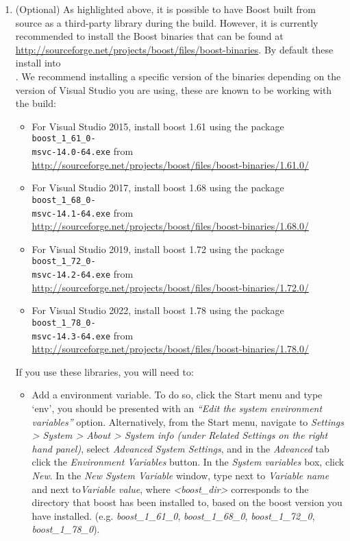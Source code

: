 \begin{enumerate}
  \item (Optional) As highlighted above, it is possible to have Boost built
  from source as a third-party library during the \nekpp build. However, it
  is currently recommended to install the Boost binaries that can be found at
  \url{http://sourceforge.net/projects/boost/files/boost-binaries}. By
  default these install into \\ . We recommend installing a specific version of the
    binaries depending on the version of Visual Studio you are using,
    these are known to be working with the \nekpp build:
  \begin{itemize}
  	\item For Visual Studio 2015, install boost 1.61 using the package
	 \texttt{boost\_1\_61\_0-\\msvc-14.0-64.exe} from \url{http://sourceforge.net/projects/boost/files/boost-binaries/1.61.0/}
  	\item For Visual Studio 2017, install boost 1.68 using the package
	 \texttt{boost\_1\_68\_0-\\msvc-14.1-64.exe} from \url{http://sourceforge.net/projects/boost/files/boost-binaries/1.68.0/}
  	\item For Visual Studio 2019, install boost 1.72 using the package
	 \texttt{boost\_1\_72\_0-\\msvc-14.2-64.exe}  from \url{http://sourceforge.net/projects/boost/files/boost-binaries/1.72.0/}
    \item For Visual Studio 2022, install boost 1.78 using the package
	 \texttt{boost\_1\_78\_0-\\msvc-14.3-64.exe}  from \url{http://sourceforge.net/projects/boost/files/boost-binaries/1.78.0/}
  \end{itemize}
  If you use these libraries, you will need to:
  \begin{itemize}
  	\item Add a  environment variable. To do so, click the
	Start menu and type `env', you should be presented with an \emph{``Edit
  the system environment variables''} option. Alternatively, from the Start
  menu, navigate to \emph{Settings > System > About > System info
	(under Related Settings on the right hand panel)}, select
	\emph{Advanced System Settings}, and in the \emph{Advanced} tab click the
	\emph{Environment Variables} button. In the \emph{System variables} box,
  click \emph{New}. In the \emph{New System Variable} window, type
   next to \emph{Variable name} and
   next to\emph{Variable value}, where \emph{<boost\_dir>}
  corresponds to the directory that boost has been installed to, based on the
  boost version you have installed. (e.g. \emph{boost\_1\_61\_0},
  \emph{boost\_1\_68\_0}, \emph{boost\_1\_72\_0}, \emph{boost\_1\_78\_0}).


\end{itemize}
\end{enumerate}
